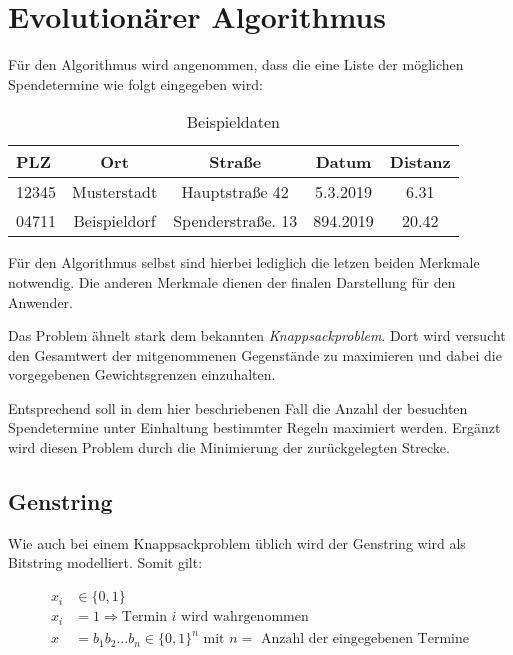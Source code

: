 \section{Evolutionärer Algorithmus}\label{sec:evol-alg}
Für den Algorithmus wird angenommen,
dass die eine Liste der möglichen Spendetermine wie folgt eingegeben wird:
\begin{table}[ht]
    \begin{center}
        \begin{tabular}{l|c|c|c|c}
            PLZ     & Ort               &  Straße               & Datum     & Distanz   \\
            \hline
            12345   & Musterstadt       & Hauptstraße 42        & 5.3.2019  & 6.31      \\
            04711   & Beispieldorf      & Spenderstraße. 13     & 894.2019  & 20.42     \\
        \end{tabular}
    \end{center}
    \caption{Beispieldaten}
\end{table}


Für den Algorithmus selbst sind hierbei lediglich die letzen beiden Merkmale notwendig.
Die anderen Merkmale dienen der finalen Darstellung für den Anwender.

Das Problem ähnelt stark dem bekannten \emph{Knappsackproblem}.
Dort wird versucht den Gesamtwert der mitgenommenen Gegenstände zu maximieren
und dabei die vorgegebenen Gewichtsgrenzen einzuhalten.

Entsprechend soll in dem hier beschriebenen Fall die Anzahl der besuchten Spendetermine unter
Einhaltung bestimmter Regeln maximiert werden.
Ergänzt wird diesen Problem durch die Minimierung der zurückgelegten Strecke.

\subsection{Genstring}
Wie auch bei einem Knappsackproblem üblich wird der Genstring wird als Bitstring modelliert.
Somit gilt:

\begin{equation}
    \label{eqn:genstring}
    \begin{split}
        x_i &\in \{ 0,1 \} \\
        x_i &= 1 \Rightarrow \text{Termin $i$ wird wahrgenommen} \\
        x   &= b_1b_2...b_n \in \{0,1\}^n\text{ mit $n = $ Anzahl der eingegebenen Termine}
    \end{split}
\end{equation}



